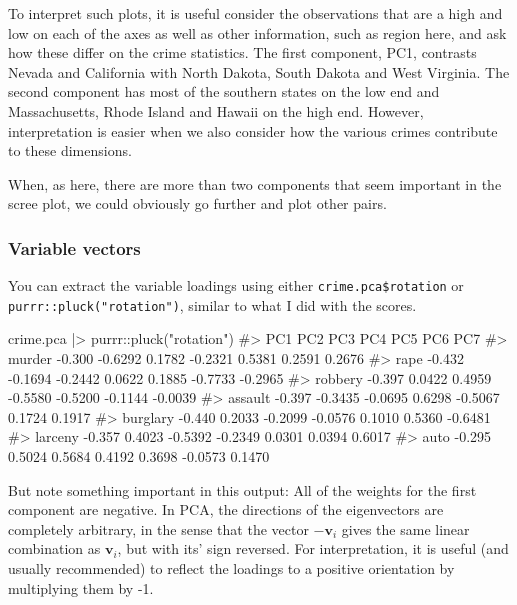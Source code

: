 \documentclass[
  letterpaper,
  10pt,
  krantz2]{krantz}
\makeatletter
\newenvironment{Shaded}{\begin{snugshade}}{\end{snugshade}}
\newcommand{\CommentTok}[1]{\textcolor[rgb]{0.37,0.37,0.37}{#1}}
\newcommand{\FunctionTok}[1]{\textcolor[rgb]{0.28,0.35,0.67}{#1}}
\newcommand{\NormalTok}[1]{\textcolor[rgb]{0.00,0.23,0.31}{#1}}
\newcommand{\SpecialCharTok}[1]{\textcolor[rgb]{0.37,0.37,0.37}{#1}}
\newcommand{\StringTok}[1]{\textcolor[rgb]{0.13,0.47,0.30}{#1}}
\newenvironment{kframe}{%
  \medskip{}
  \setlength{\fboxsep}{.8em}
  \def\at@end@of@kframe{}%
  \ifinner\ifhmode%
  \def\at@end@of@kframe{\end{minipage}}%
  \begin{minipage}{\columnwidth}%
  \fi\fi%
  \def\FrameCommand##1{\hskip\@totalleftmargin \hskip-\fboxsep
  \colorbox{shadecolor}{##1}\hskip-\fboxsep
      \hskip-\linewidth \hskip-\@totalleftmargin \hskip\columnwidth}%
  \MakeFramed {\advance\hsize-\width
    \@totalleftmargin\z@ \linewidth\hsize
    \@setminipage}}%
{\par\unskip\endMakeFramed%
  \at@end@of@kframe}
\renewenvironment{Shaded}{\begin{kframe}}{\end{kframe}}
\makeatother
\begin{document}
To interpret such plots, it is useful consider the observations that are
a high and low on each of the axes as well as other information, such as
region here, and ask how these differ on the crime statistics. The first
component, PC1, contrasts Nevada and California with North Dakota, South
Dakota and West Virginia. The second component has most of the southern
states on the low end and Massachusetts, Rhode Island and Hawaii on the
high end. However, interpretation is easier when we also consider how
the various crimes contribute to these dimensions.

When, as here, there are more than two components that seem important in
the scree plot, we could obviously go further and plot other pairs.

\hypertarget{variable-vectors}{%
\subsubsection*{Variable vectors}\label{variable-vectors}}

You can extract the variable loadings using either
\texttt{crime.pca\$rotation} or \texttt{purrr::pluck("rotation")},
similar to what I did with the scores.

\begin{Shaded}
\begin{Highlighting}[]
\NormalTok{crime.pca }\SpecialCharTok{|\textgreater{}}\NormalTok{ purrr}\SpecialCharTok{::}\FunctionTok{pluck}\NormalTok{(}\StringTok{"rotation"}\NormalTok{)}
\CommentTok{\#\textgreater{}             PC1     PC2     PC3     PC4     PC5     PC6     PC7}
\CommentTok{\#\textgreater{} murder   {-}0.300 {-}0.6292  0.1782 {-}0.2321  0.5381  0.2591  0.2676}
\CommentTok{\#\textgreater{} rape     {-}0.432 {-}0.1694 {-}0.2442  0.0622  0.1885 {-}0.7733 {-}0.2965}
\CommentTok{\#\textgreater{} robbery  {-}0.397  0.0422  0.4959 {-}0.5580 {-}0.5200 {-}0.1144 {-}0.0039}
\CommentTok{\#\textgreater{} assault  {-}0.397 {-}0.3435 {-}0.0695  0.6298 {-}0.5067  0.1724  0.1917}
\CommentTok{\#\textgreater{} burglary {-}0.440  0.2033 {-}0.2099 {-}0.0576  0.1010  0.5360 {-}0.6481}
\CommentTok{\#\textgreater{} larceny  {-}0.357  0.4023 {-}0.5392 {-}0.2349  0.0301  0.0394  0.6017}
\CommentTok{\#\textgreater{} auto     {-}0.295  0.5024  0.5684  0.4192  0.3698 {-}0.0573  0.1470}
\end{Highlighting}
\end{Shaded}

But note something important in this output: All of the weights for the
first component are negative. In PCA, the directions of the eigenvectors
are completely arbitrary, in the sense that the vector \(-\mathbf{v}_i\)
gives the same linear combination as \(\mathbf{v}_i\), but with its'
sign reversed. For interpretation, it is useful (and usually
recommended) to reflect the loadings to a positive orientation by
multiplying them by -1.
\end{document}

